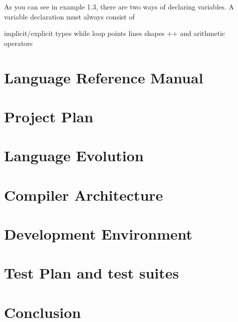 \documentclass{l3proj}
\begin{document}
As you can see in example 1.3, there are two ways of declaring variables. A variable declaration must always consist of 

implicit/explicit types
while loop
points
lines
shapes
++ and arithmetic operators



\chapter{Language Reference Manual}
\label{manual}

\chapter{Project Plan}
\label{plan}

\chapter{Language Evolution}
\label{evo}

\chapter{Compiler Architecture}
\label{arch}

\chapter{Development Environment}
\label{dev}

\chapter{Test Plan and test suites}
\label{test}

\chapter{Conclusion}
\label{conc}

\end{document}
